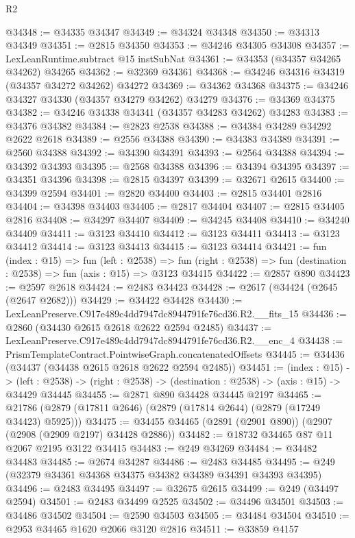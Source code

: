 \begin{lexlean}{R2}
\begin{coremodule}
@34348 := @34335 @34347
@34349 := @34324 @34348
@34350 := @34313 @34349
@34351 := @2815 @34350
@34353 := @34246 @34305 @34308
@34357 := LexLeanRuntime.subtract @15 instSubNat
@34361 := @34353 (@34357 @34265 @34262) @34265
@34362 := @32369 @34361
@34368 := @34246 @34316 @34319 (@34357 @34272 @34262) @34272
@34369 := @34362 @34368
@34375 := @34246 @34327 @34330 (@34357 @34279 @34262) @34279
@34376 := @34369 @34375
@34382 := @34246 @34338 @34341 (@34357 @34283 @34262) @34283
@34383 := @34376 @34382
@34384 := @2823 @2538
@34388 := @34384 @34289 @34292 @2622 @2618
@34389 := @2556 @34388
@34390 := @34383 @34389
@34391 := @2560 @34388
@34392 := @34390 @34391
@34393 := @2564 @34388
@34394 := @34392 @34393
@34395 := @2568 @34388
@34396 := @34394 @34395
@34397 := @34351 @34396
@34398 := @2815 @34397
@34399 := @32671 @2615
@34400 := @34399 @2594
@34401 := @2820 @34400
@34403 := @2815 @34401 @2816
@34404 := @34398 @34403
@34405 := @2817 @34404
@34407 := @2815 @34405 @2816
@34408 := @34297 @34407
@34409 := @34245 @34408
@34410 := @34240 @34409
@34411 := @3123 @34410
@34412 := @3123 @34411
@34413 := @3123 @34412
@34414 := @3123 @34413
@34415 := @3123 @34414
@34421 := fun (index : @15) =>
  fun (left : @2538) =>
  fun (right : @2538) => fun (destination : @2538) => fun (axis : @15) => @3123 @34415
@34422 := @2857 @890
@34423 := @2597 @2618
@34424 := @2483 @34423
@34428 := @2617 (@34424 (@2645 (@2647 @2682)))
@34429 := @34422 @34428
@34430 := LexLeanPreserve.C917e489c4dd7947dc8944791fe76cd36.R2.__fits_15
@34436 := @2860 (@34430 @2615 @2618 @2622 @2594 @2485)
@34437 := LexLeanPreserve.C917e489c4dd7947dc8944791fe76cd36.R2.__enc_4
@34438 := PrismTemplateContract.PointwiseGraph.concatenatedOffsets
@34445 := @34436 (@34437 (@34438 @2615 @2618 @2622 @2594 @2485))
@34451 := (index : @15) ->
  (left : @2538) -> (right : @2538) -> (destination : @2538) -> (axis : @15) -> @34429 @34445
@34455 := @2871 @890 @34428 @34445 @2197
@34465 := @21786 (@2879 (@17811 @2646) (@2879 (@17814 @2644) (@2879 (@17249 @34423) @5925)))
@34475 := @34455 @34465 (@2891 (@2901 @890)) (@2907 (@2908 (@2909 @2197) @34428 @2886))
@34482 := @18732 @34465 @87 @11 @2067 @2195 @3122 @34415
@34483 := @249 @34269
@34484 := @34482 @34483
@34485 := @2674 @34287
@34486 := @2483 @34485
@34495 := @249 (@32379 @34361 @34368 @34375 @34382 @34389 @34391 @34393 @34395)
@34496 := @2483 @34495
@34497 := @32675 @2615
@34499 := @249 (@34497 @2594)
@34501 := @2483 @34499 @2525
@34502 := @34496 @34501
@34503 := @34486 @34502
@34504 := @2590 @34503
@34505 := @34484 @34504
@34510 := @2953 @34465 @1620 @2066 @3120 @2816
@34511 := @33859 @4157

\end{coremodule}
\end{lexlean}
